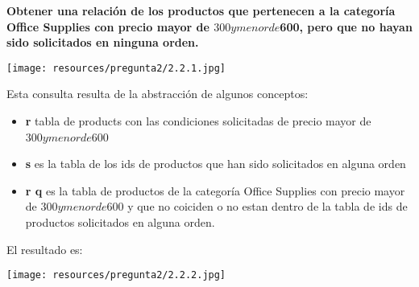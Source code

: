 \textbf{Obtener una relación de los productos que pertenecen a la categoría Office Supplies con precio mayor de $300 y menor de $600, pero que no hayan sido solicitados en ninguna orden.} \vspace{.3cm}

\begin{center}
    \texttt{[image: resources/pregunta2/2.2.1.jpg]}
\end{center}

Esta consulta resulta de la abstracción de algunos conceptos:
\begin{itemize}
    \item \textbf{r} tabla de products con las condiciones solicitadas de precio mayor de $300 y menor de $600
    \item  \textbf{s} es la tabla de los ids de productos que han sido solicitados en alguna orden
    \item  \textbf{r \vartriangleright q} es la tabla de productos de la categoría Office Supplies con precio mayor de $300 y menor de $600 y que no coiciden o no estan dentro de la tabla de ids de productos solicitados en alguna orden.
\end{itemize}

El resultado es:

\begin{center}
    \texttt{[image: resources/pregunta2/2.2.2.jpg]}
\end{center}